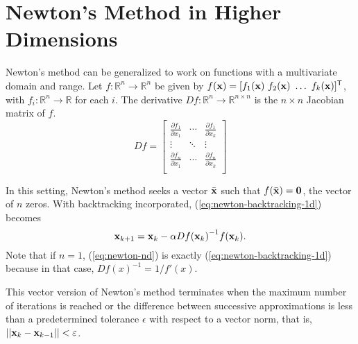 \section*{Newton's Method in Higher Dimensions} %

Newton's method can be generalized to work on functions with a multivariate domain and range.
Let $f:\mathbb{R}^n\rightarrow\mathbb{R}^n$ be given by $f(\x)=[f_1(\x)\ f_2(\x)\ \ldots\ f_k(\x)]\trp$, with $f_i:\mathbb{R}^n\to\mathbb{R}$ for each $i$.
The derivative $Df:\mathbb{R}^n\rightarrow\mathbb{R}^{n\times n}$ is the $n\times n$ Jacobian matrix of $f$.
\[
Df =
\left[\begin{array}{ccc}
\frac{\partial f_1}{\partial x_1} & \cdots & \frac{\partial f_1}{\partial x_k} \\
\vdots & \ddots & \vdots \\
\frac{\partial f_n}{\partial x_1} & \cdots & \frac{\partial f_n}{\partial x_k} \\
\end{array}\right]
\]

In this setting, Newton's method seeks a vector $\bar{\mathbf{x}}$ such that $f(\bar{\mathbf{x}}) = \mathbf{0}$, the vector of $n$ zeros.
With backtracking incorporated, (\ref{eq:newton-backtracking-1d}) becomes
\begin{equation}
\mathbf{x}_{k+1} = \mathbf{x}_k - \alpha{Df(\mathbf{x}_k)}^{-1}{f(\mathbf{x}_k)}.
\label{eq:newton-nd}
\end{equation}
Note that if $n = 1$, (\ref{eq:newton-nd}) is exactly (\ref{eq:newton-backtracking-1d}) because in that case, $Df(x)^{-1} = 1/f'(x)$.

This vector version of Newton's method terminates when the maximum number of iterations is reached or the difference between successive approximations is less than a predetermined tolerance $\epsilon$ with respect to a vector norm, that is, $||\mathbf{x}_k - \mathbf{x}_{k-1}|| < \varepsilon$.


